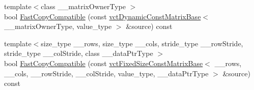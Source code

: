 {\bf }\par
\begin{DoxyCompactItemize}
\item 
{\footnotesize template$<$class \+\_\+\+\_\+matrix\+Owner\+Type $>$ }\\bool \hyperlink{classvct_dynamic_const_matrix_base_ad9551ca1ece96b5e9512f8407cee3537}{Fast\+Copy\+Compatible} (const \hyperlink{classvct_dynamic_const_matrix_base}{vct\+Dynamic\+Const\+Matrix\+Base}$<$ \+\_\+\+\_\+matrix\+Owner\+Type, value\+\_\+type $>$ \&source) const 
\item 
{\footnotesize template$<$size\+\_\+type \+\_\+\+\_\+rows, size\+\_\+type \+\_\+\+\_\+cols, stride\+\_\+type \+\_\+\+\_\+row\+Stride, stride\+\_\+type \+\_\+\+\_\+col\+Stride, class \+\_\+\+\_\+data\+Ptr\+Type $>$ }\\bool \hyperlink{classvct_dynamic_const_matrix_base_a609bdc3122a3dfd1d4b71ec4af7a666b}{Fast\+Copy\+Compatible} (const \hyperlink{classvct_fixed_size_const_matrix_base}{vct\+Fixed\+Size\+Const\+Matrix\+Base}$<$ \+\_\+\+\_\+rows, \+\_\+\+\_\+cols, \+\_\+\+\_\+row\+Stride, \+\_\+\+\_\+col\+Stride, value\+\_\+type, \+\_\+\+\_\+data\+Ptr\+Type $>$ \&source) const 
\end{DoxyCompactItemize}

